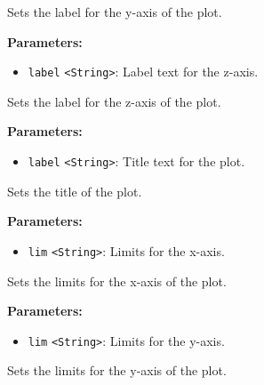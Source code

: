 \documentclass[12pt,a4paper]{article}
\begin{document}
\noindent Sets the label for the y-axis of the plot.

\vspace{5mm}
\noindent {}


\noindent \textbf{Parameters:}
\begin{itemize}
  \item \texttt{label} \texttt{<String>}: Label text for the z-axis.
\end{itemize}

\noindent Sets the label for the z-axis of the plot.

\vspace{5mm}
\noindent {}


\noindent \textbf{Parameters:}
\begin{itemize}
  \item \texttt{label} \texttt{<String>}: Title text for the plot.
\end{itemize}

\noindent Sets the title of the plot.

\vspace{5mm}
\noindent {}


\noindent \textbf{Parameters:}
\begin{itemize}
  \item \texttt{lim} \texttt{<String>}: Limits for the x-axis.
\end{itemize}

\noindent Sets the limits for the x-axis of the plot.

\vspace{5mm}
\noindent {}


\noindent \textbf{Parameters:}
\begin{itemize}
  \item \texttt{lim} \texttt{<String>}: Limits for the y-axis.
\end{itemize}

\noindent Sets the limits for the y-axis of the plot.
\end{document}
